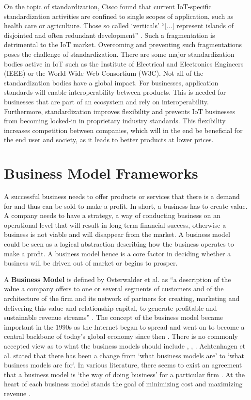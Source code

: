 		On the topic of standardization, Cisco found that current IoT-specific standardization activities are confined to single scopes of application, such as health care or agriculture. Those so called `verticals' ``[...] represent islands of disjointed and often redundant development'' \cite{cisco}. Such a fragmentation is detrimental to the IoT market. Overcoming and preventing such fragmentations poses the challenge of standardization. There are some major standardization bodies active in IoT such as the Institute of Electrical and Electronics Engineers (IEEE) or the World Wide Web Consortium (W3C). Not all of the standardization bodies have a global impact. For businesses, application standards will enable interoperability between products. This is needed for businesses that are part of an ecosystem and rely on interoperability. Furthermore, standardization improves flexibility and prevents IoT businesses from becoming locked-in in proprietary industry standards. This flexibility increases competition between companies, which will in the end be beneficial for the end user and society, as it leads to better products at lower prices.
%
\vspace{-1em}
\section{Business Model Frameworks}
\label{sec:bmf}	
\vspace{-1em}
	A successful business needs to offer products or services that there is a demand for and thus can be sold to make a profit. In short, a business has to create value. A company needs to have a strategy, a way of conducting business on an operational level that will result in long term financial success, otherwise a business is not viable and will disappear from the market. A business model could be seen as a logical abstraction describing how the business operates to make a profit. A business model hence is a core factor in deciding whether a business will be driven out of market or begins to prosper.
	
	A \textbf{Business Model} is defined by Osterwalder et al. as ``a description of the value a company offers to one or several segments of customers and of the architecture of the firm and its network of partners for creating, marketing and delivering this value and relationship capital, to generate profitable and sustainable revenue streams'' \cite{osterwalder2005}. The concept of the business model became important in the 1990s as the Internet began to spread and went on to become a central backbone of today's global economy since then \cite{zott}. There is no commonly accepted view as to what the business models should include \cite{morris}, \cite{osterwalder2005}, \cite{schweizer}. Achtenhagen et al. \cite{achtenhagen} stated that there has been a change from `what business models are' to `what business models are for'. In various literature, there seems to exist an agreement that a business model is `the way of doing business' for a particular firm \cite{westerlund}. At the heart of each business model stands the goal of minimizing cost and maximizing revenue \cite{ju}.\\
	
